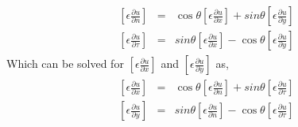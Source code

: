 \begin{eqnarray}
\begin{aligned}
			\left[\epsilon \frac{\partial u}{\partial n}\right] &=& \cos \theta \left[\epsilon \frac{\partial u}{\partial x}\right] + sin \theta \left[\epsilon \frac{\partial u}{\partial y}\right]\label{epun} \\
			\left[\epsilon \frac{\partial u}{\partial \tau}\right] &=& sin \theta \left[\epsilon \frac{\partial u}{\partial x}\right] - \cos \theta\left[\epsilon \frac{\partial u}{\partial y}\right]\label{eput}	
\end{aligned}		
\end{eqnarray}
Which can be solved for $ \left[\epsilon \frac{\partial u}{\partial x}\right]$ and $\left[\epsilon \frac{\partial u}{\partial y}\right]$ as,
\begin{eqnarray}
\begin{aligned}
	\left[\epsilon \frac{\partial u}{\partial x}\right] &=& \cos \theta \left[\epsilon \frac{\partial u}{\partial n}\right] +sin \theta \left[\epsilon \frac{\partial u}{\partial \tau}\right]\label{epux1} \\
	\left[\epsilon \frac{\partial u}{\partial y}\right] &=& sin \theta \left[\epsilon \frac{\partial u}{\partial n}\right] -\cos \theta \left[\epsilon \frac{\partial u}{\partial \tau}\right]\label{epuy1}
\end{aligned}	
\end{eqnarray}

